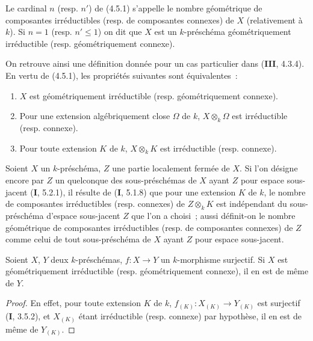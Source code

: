 \begin{definition}[4.5.2]
\label{IV.2.4.5.2-fr}
Le cardinal $n$ \textup{(resp.} $n'$\textup{)} de \textup{(4.5.1)} s'appelle le nombre géométrique
de composantes irréductibles \textup{(resp.} de composantes connexes\textup{)} de $X$
(relativement à $k$). Si $n=1$ \textup{(resp.} $n'\leqslant1$\textup{)} on dit que $X$ est un
$k$-préschéma géométriquement irréductible \textup{(resp.} géométriquement
connexe\textup{)}.
\end{definition}

On retrouve ainsi une définition donnée pour un cas particulier dans
(\textbf{III}, 4.3.4). En vertu de (4.5.1), les propriétés suivantes sont
équivalentes~:
\begin{enumerate}
\item[$a)$] $X$ est géométriquement irréductible (resp. géométriquement
connexe).
\item[$b)$] Pour une extension algébriquement close $\Omega$ de $k$,
$X\otimes_k\Omega$ est irréductible (resp. connexe).
\item[$c)$] Pour toute extension $K$ de $k$, $X\otimes_k K$ est irréductible
(resp. connexe).
\end{enumerate}

\begin{env}[4.5.3]
\label{IV.2.4.5.3-fr}
Soient $X$ un $k$-préschéma, $Z$ une partie localement fermée de $X$. Si l'on
désigne encore par $Z$ un quelconque des sous-préschémas de $X$ ayant $Z$ pour
espace sous-jacent (\textbf{I}, 5.2.1), il résulte de (\textbf{I}, 5.1.8) que pour une extension
$K$ de $k$, le nombre de composantes irréductibles (resp. connexes) de
$Z\otimes_k K$ est indépendant du sous-préschéma d'espace sous-jacent $Z$ que
l'on a choisi~; aussi définit-on le nombre géométrique de composantes
irréductibles (resp. de composantes connexes) de $Z$ comme celui de tout
sous-préschéma de $X$ ayant $Z$ pour espace sous-jacent.
\end{env}

\begin{proposition}[4.5.4]
\label{IV.2.4.5.4-fr}
Soient $X$, $Y$ deux $k$-préschémas, $f:X\to Y$ un $k$-morphisme surjectif.
Si $X$ est géométriquement irréductible \textup{(resp.} géométriquement connexe\textup{)}, il en
est de même de $Y$.
\end{proposition}


\begin{proof}
En effet, pour toute extension $K$ de $k$, $f_{(K)}:X_{(K)}\to Y_{(K)}$ est
surjectif (\textbf{I}, 3.5.2), et $X_{(K)}$ étant irréductible (resp. connexe) par
hypothèse, il en est de même de $Y_{(K)}$.
\end{proof}

